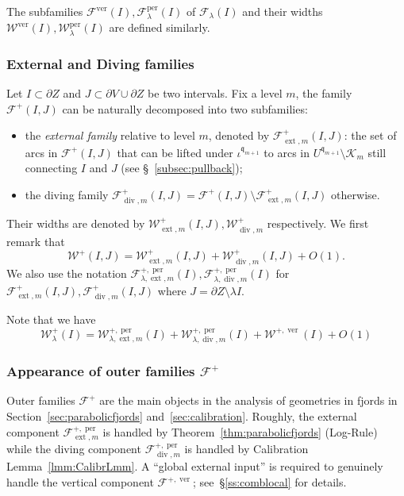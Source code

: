 \documentclass{amsart}
\newcommand{\1}{{\mathbb 1 }}
\newcommand{\ext}{{\operatorname{ext}}}
\renewcommand{\div}{{\operatorname{div}}}
\newcommand{\Fam}{{\mathcal F}}
\newcommand{\Width}{{\mathcal W}}
\newcommand{\qq}{\mathfrak{q}}
\newcommand\ver{{\operatorname{ver}}}
\newcommand\per{{\operatorname{per}}}
\theoremstyle{remark}
\numberwithin{equation}{section}
\theoremstyle{definition}
\newcommand{\filled}{{\mathcal {K} }}
\begin{document}
The subfamilies $\Fam^{\ver}(I), \Fam^{\per}_{\lambda}(I)$ of $\Fam_\lambda(I)$ and their widths $\Width^{\ver}(I), \Width^{\per}_{\lambda}(I)$ are defined similarly.

\subsubsection{External and Diving families}\label{subsubsec:externaldiving}
Let $I \subset \partial Z$ and $J \subset \partial V \cup \partial Z$ be two intervals.
Fix a level $m$, the family $\Fam^+(I,J)$ can be naturally decomposed into two subfamilies:
\begin{itemize}
    \item the {\em external family} relative to level $m$, denoted by $\Fam^+_{\ext, m}(I,J)$: the set of arcs in $\Fam^+(I,J)$ that can be lifted under $\iota^{\qq_{m+1}}$ to arcs in $U^{\qq_{m+1}}\setminus \filled_m$ still connecting $I$ and $J$ (see \S~\ref{subsec:pullback}); 
    \item the diving family $\Fam^+_{\div, m}(I,J) = \Fam^+(I,J)\setminus \Fam^+_{\ext, m}(I,J)$ otherwise.
\end{itemize}
Their widths are denoted by $\Width^+_{\ext,m}(I,J), \Width^+_{\div, m}$ respectively.
We first remark that 
\[ \Width^+(I,J)=\Width^+_{\ext,m}(I,J) + \Width^+_{\div, m}(I,J)+O(1).\]
We also use the notation $\Fam^{+, \per}_{\lambda, \ext, m}(I), \Fam^{+, \per}_{\lambda, \div, m}(I)$ for $\Fam^+_{\ext, m}(I,J), \Fam^+_{\div, m}(I,J)$ where $J = \partial Z \setminus \lambda I$.


Note that we have
\begin{equation}\label{eqn:decomposition}
    \Width^+_\lambda(I)=\Width^{+,\per}_{\lambda, \ext,m}(I) + \Width^{+,\per}_{\lambda, \div,m}(I)+\Width^{+,\ver}(I) + O(1)
\end{equation}



\subsubsection{Appearance of outer families $\Fam^+$}\label{sss:occ:Fam^+} Outer families $\Fam^+$ are the main objects in the analysis of geometries in fjords in Section~\ref{sec:parabolicfjords} and~\ref{sec:calibration}. Roughly, the external component $\Fam^{+,\per}_{\ext, m}$ is handled by Theorem~\ref{thm:parabolicfjords} (Log-Rule) while the diving component $\Fam^{+,\per}_{\div, m}$ is handled by Calibration Lemma~\ref{lmm:CalibrLmm}. A ``global external input'' is required to genuinely handle the vertical component $\Fam^{+,\ver}$; see~\S\ref{ss:comblocal} for details.
\end{document}
